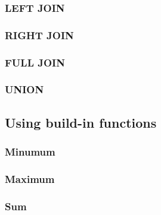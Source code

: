 \documentclass[12pt]{article} %
\begin{document}

\subsubsection{LEFT JOIN} %


\subsubsection{RIGHT JOIN} %


\subsubsection{FULL JOIN} %


\subsubsection{UNION} %


\subsection{Using build-in functions} %


\subsubsection{Minumum} %


\subsubsection{Maximum} %


\subsubsection{Sum} %
\end{document}
